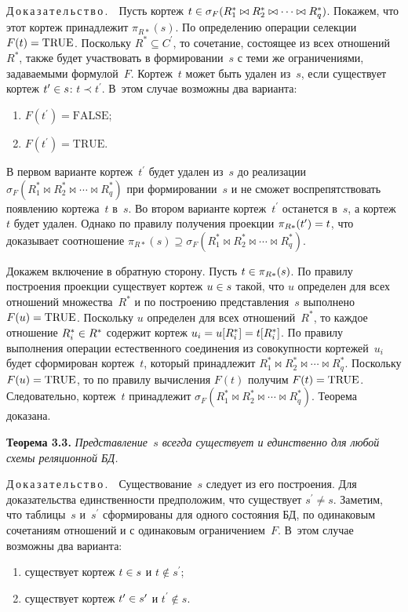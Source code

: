 \begin{multicols}{2}
  \smallskip
  
  \noindent
  Д\,о\,к\,а\,з\,а\,т\,е\,л\,ь\,с\,т\,в\,о\,.\ \ Пусть кортеж $t\hm\in 
\sigma_F(R_1^*\hm\bowtie R_2^*\bowtie \cdots\bowtie R_q^*)$. Покажем, что этот 
кортеж принадлежит $\pi_{R*}(s)$. По определению операции селекции $F(t)\hm 
=\mathrm{TRUE}$. Поскольку $R^*\subseteq C^\prime$, то сочетание, состоящее из всех 
отношений~$R^*$, также будет участвовать в формировании~$s$ с теми же 
ограничениями, задаваемыми формулой~$F$. Кортеж~$t$ может быть удален 
из~$s$, если существует кортеж $t^\prime\hm\in s$: $t\prec t^\prime$. В~этом 
случае возможны два варианта:
  \begin{enumerate}[(1)]
  \item $F(t^\prime)=\mathrm{FALSE}$;
  \item $F(t^\prime)=\mathrm{TRUE}$.
  \end{enumerate}
  
  В первом варианте кортеж~$t^\prime$ будет удален из~$s$ до реализации 
$\sigma_F(R_1^*\bowtie R_2^*\bowtie\cdots\bowtie R_q^*)$ при 
формировании~$s$ и не сможет воспрепятствовать появлению кортежа~$t$ 
в~$s$. Во втором варианте кортеж~$t^\prime$ останется в~$s$, а кортеж~$t$ 
будет удален. Однако по правилу получения проекции $\pi_{R*}(t^\prime)\hm=t$, 
что доказывает соотношение $\pi_{R*}(s)\supseteq \sigma_F(R_1^*\bowtie 
R_2^*\bowtie\cdots\bowtie R_q^*)$.
  
  Докажем включение в обратную сторону. Пусть $t\hm\in \pi_{R*}(s)$. По 
правилу построения проекции существует кортеж $u\hm\in s$ такой, что $u$ 
определен для всех отношений множества~$R^*$ и по построению 
представления~$s$ выполнено $F(u)\hm=\mathrm{TRUE}$. Поскольку $u$ определен для 
всех отношений~$R^*$, то каждое отношение $R_i^*\hm\in R^*$ содержит 
кортеж $u_i\hm=u[R_i^*]\hm=t[R_i^*]$. По правилу выполнения операции 
естественного соединения из совокупности кортежей~$u_i$ будет сформирован 
кортеж~$t$, который принадлежит $R_1^*\bowtie R_2^*\bowtie \cdots\bowtie 
R_q^*$. Поскольку $F(u)\hm=\mathrm{TRUE}$, то по правилу вычисления $F(t)$ 
получим $F(t)\hm=\mathrm{TRUE}$. Следовательно, кортеж~$t$ принадлежит 
$\sigma_F(R_1^*\bowtie R_2^*\bowtie\cdots\bowtie R_q^*)$. Теорема доказана.
  
  \medskip
  
  \noindent
  \textbf{Теорема 3.3.} \textit{Представление~$s$ всегда существует и 
единственно для любой схемы реляционной БД.}
  
  \smallskip
  
  \noindent
  Д\,о\,к\,а\,з\,а\,т\,е\,л\,ь\,с\,т\,в\,о\,.\ \ Существование~$s$ следует из его 
построения. Для доказательства един\-ст\-вен\-ности предположим, что существует 
$s^\prime\not= s$. Заметим, что таблицы~$s$ и~$s^\prime$ сформированы для 
одного состояния БД, по одинаковым сочетаниям отношений и с одинаковым 
ограничением~$F$. В~этом случае возможны два варианта:
  \begin{enumerate}[(1)]
  \item существует кортеж $t\hm\in s$ и $t\notin s^\prime$;
  \item существует кортеж $t^\prime \hm\in s^\prime$ и $t^\prime \notin s$.
  \end{enumerate}
  

\end{multicols}
